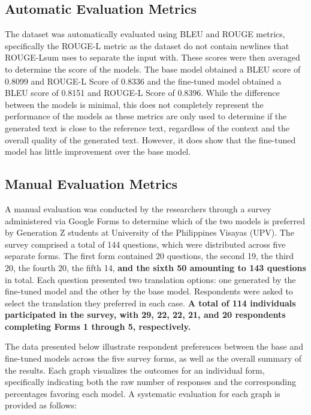 \subsection{Automatic Evaluation Metrics}
The dataset was automatically evaluated using BLEU and ROUGE metrics, specifically the ROUGE-L metric as the dataset do not contain newlines that ROUGE-Lsum uses to separate the input with. These scores were then averaged to determine the score of the models. The base model obtained a BLEU score of 0.8099 and ROUGE-L Score of 0.8336 and the fine-tuned model obtained a BLEU score of 0.8151 and ROUGE-L Score of 0.8396. While the difference between the models is minimal, this does not completely represent the performance of the models as these metrics are only used to determine if the generated text is close to the reference text, regardless of the context and the overall quality of the generated text. However, it does show that the fine-tuned model has little improvement over the base model.

\subsection{Manual Evaluation Metrics}
A manual evaluation was conducted by the researchers through a survey administered via Google Forms to determine which of the two models is preferred by Generation Z students at University of the Philippines Visayas (UPV). The survey comprised a total of 144 questions, which were distributed across five separate forms. The first form contained 20 questions, the second 19, the third 20, the fourth 20, the fifth 14, \textbf{and the sixth 50 amounting to 143 questions} in total. Each question presented two translation options: one generated by the fine-tuned model and the other by the base model. Respondents were asked to select the translation they preferred in each case.\textbf{ A total of 114 individuals participated in the survey, with 29, 22, 22, 21, and 20 respondents completing Forms 1 through 5, respectively. }

The data presented below illustrate respondent preferences between the base and fine-tuned models across the five survey forms, as well as the overall summary of the results. Each graph visualizes the outcomes for an individual form, specifically indicating both the raw number of responses and the corresponding percentages favoring each model. A systematic evaluation for each graph is provided as follows:

